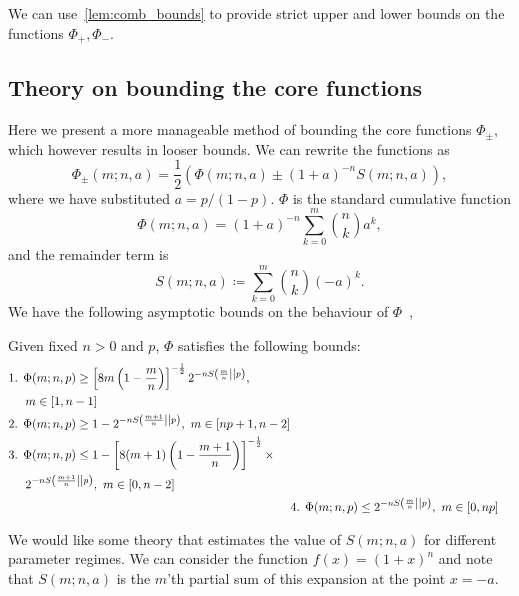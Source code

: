 \documentclass[pra,
aps,
twocolumn,
superscriptaddress,
groupedaddress,
nofootinbib,
reprint
]{revtex4-1}
\begin{document}
We can use~\cref{lem:comb_bounds} to provide strict upper and lower bounds on the functions $\Phi_+, \Phi_-$.

\subsection{Theory on bounding the core functions}
Here we present a more manageable method of bounding the core functions $\Phi_{\pm}$, which however results in looser bounds. 
We can rewrite the functions as
\begin{equation}
	\Phi_{\pm}(m; n, a) = \frac{1}{2}(\Phi(m; n, a) \pm (1+a)^{-n} S(m; n, a)),
\end{equation}
where we have substituted $a = p/(1-p)$. 
$\Phi$ is the standard cumulative function
\begin{equation}
	\Phi(m; n, a) = (1+a)^{-n} \sum_{k=0}^m \binom{n}{k} a^k,
\end{equation}
and the remainder term is
\begin{equation}
	S(m; n, a) \coloneqq \sum_{k=0}^m \binom{n}{k} (-a)^k.
\end{equation}
We have the following asymptotic bounds on the behaviour of $\Phi$~\cite{cit:ash},
\begin{lemma}\label{lem:phi_bounds}
	Given fixed $n>0$ and $p$, $\Phi$ satisfies the following bounds:
	\begin{align*}
		\begin{split}
		&\text{1. } \Phi(m; n, p) \geq \left[ 8m\left(1-\frac{m}{n}\right) \right]^{-\frac{1}{2}} 2^{-n\ent{\frac{m}{n}}{p}}, \\
		&\hspace{14pt} m\in [1,n-1] \\
		&\text{2. } \Phi(m; n, p) \geq 1 - 2^{-n\ent{\frac{m+1}{n}}{p}},\ m\in [np+1,n-2] \\
		&\text{3. } \Phi(m; n, p) \leq 1 - \left[ 8(m+1)\left(1-\frac{m+1}{n}\right) \right]^{-\frac{1}{2}}\times \\
		&\hspace{14pt} 2^{-n\ent{\frac{m+1}{n}}{p}},\ m\in [0,n-2]
		\end{split}
		\\
		&\text{4. } \Phi(m; n, p) \leq 2^{-n\ent{\frac{m}{n}}{p}},\ m\in [0,np]
	\end{align*}
\end{lemma}

We would like some theory that estimates the value of $S(m; n, a)$ for different parameter regimes. 
We can consider the function $f(x) = (1+x)^n$ and note that $S(m; n, a)$ is the $m$'th partial sum of this expansion at the point $x=-a$.
\end{document}
